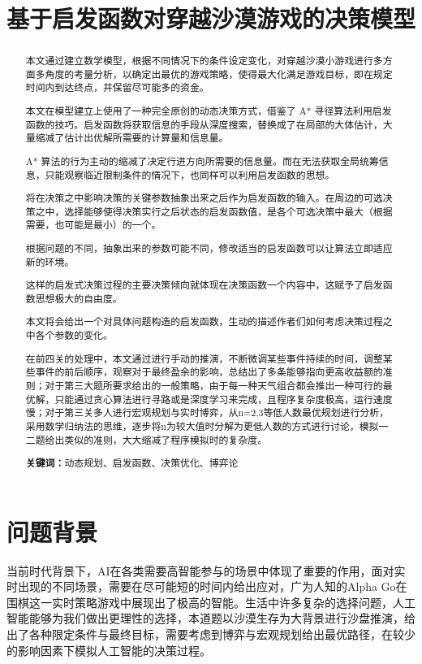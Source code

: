 \documentclass[a4paper]{ctexart}
\title{基于启发函数对穿越沙漠游戏的决策模型}
\author{}
\begin{document}
\maketitle
{}

\begin{abstract}
本文通过建立数学模型，根据不同情况下的条件设定变化，对穿越沙漠小游戏进行多方面多角度的考量分析，以确定出最优的游戏策略，使得最大化满足游戏目标，即在规定时间内到达终点，并保留尽可能多的资金。

本文在模型建立上使用了一种完全原创的动态决策方式，借鉴了 A* 寻径算法利用启发函数的技巧。启发函数将获取信息的手段从深度搜索，替换成了在局部的大体估计，大量缩减了估计出优解所需要的计算量和信息量。

A* 算法的行为主动的缩减了决定行进方向所需要的信息量。而在无法获取全局统筹信息，只能观察临近限制条件的情况下，也同样可以利用启发函数的思想。

将在决策之中影响决策的关键参数抽象出来之后作为启发函数的输入。在周边的可选决策之中，选择能够使得决策实行之后状态的启发函数值，是各个可选决策中最大（根据需要，也可能是最小）的一个。

根据问题的不同，抽象出来的参数可能不同，修改适当的启发函数可以让算法立即适应新的环境。

这样的启发式决策过程的主要决策倾向就体现在决策函数一个内容中，这赋予了启发函数思想极大的自由度。

本文将会给出一个对具体问题构造的启发函数，生动的描述作者们如何考虑决策过程之中各个参数的变化。

在前四关的处理中，本文通过进行手动的推演，不断微调某些事件持续的时间，调整某些事件的前后顺序，观察对于最终盈余的影响，总结出了多条能够指向更高收益额的准则；对于第三大题所要求给出的一般策略，由于每一种天气组合都会推出一种可行的最优解，只能通过贪心算法进行寻路或是深度学习来完成，且程序复杂度极高，运行速度慢；对于第三关多人进行宏观规划与实时博弈，从n=2,3等低人数最优规划进行分析，采用数学归纳法的思维，逐步将n为较大值时分解为更低人数的方式进行讨论，模拟一二题给出类似的准则，大大缩减了程序模拟时的复杂度。

\textbf{关键词：}动态规划、启发函数、决策优化、博弈论
    \end{abstract}

\clearpage

\section{问题背景}

当前时代背景下，AI在各类需要高智能参与的场景中体现了重要的作用，面对实时出现的不同场景，需要在尽可能短的时间内给出应对，广为人知的Alpha Go在围棋这一实时策略游戏中展现出了极高的智能。生活中许多复杂的选择问题，人工智能能够为我们做出更理性的选择，本道题以沙漠生存为大背景进行沙盘推演，给出了各种限定条件与最终目标，需要考虑到博弈与宏观规划给出最优路径，在较少的影响因素下模拟人工智能的决策过程。
\end{document}
